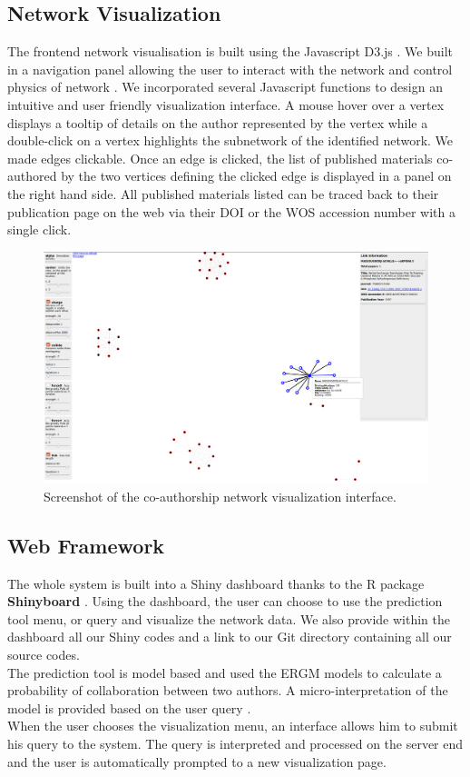 \subsection{Network Visualization}
The frontend network visualisation is built using the Javascript D3.js \cite{bostock_d3._2012}. We built in a navigation panel allowing the user to interact with the network and control physics of network \cite{newman_physics_2008}. We incorporated several Javascript functions to design an intuitive and user friendly visualization interface. A mouse hover over a vertex displays a tooltip of details on the author represented by the vertex while a double-click on a vertex highlights the subnetwork of the identified network. We made edges clickable. Once an edge is clicked, the list of published materials co-authored by the two vertices defining the clicked edge is displayed in a panel on the right hand side. All published materials listed can be traced back to their publication page on the web via their DOI or the WOS accession number with a single click.

\begin{figure}[!ht]
\centering
\hspace{-1.5cm}\includegraphics[scale=0.26]{Chapters/authorvis/vis3}
\caption{Screenshot of the co-authorship network visualization interface.}
\label{net_vis}
\end{figure}


\subsection{Web Framework}
The whole system is built into a Shiny dashboard thanks to the R package \textbf{Shinyboard} \cite{chang_shiny:_2017,chang_shinydashboard:_2015}. Using the dashboard, the user can choose to use the prediction tool menu, or query and visualize the network data. We also provide within the dashboard all our Shiny codes and a link to our Git directory containing all our source codes. \\
The prediction tool is model based and used the ERGM models to calculate a probability of collaboration between two authors. A micro-interpretation of the model is provided based on the user query  \cite{desmarais_micro-level_2012}. \\
When the user chooses the visualization menu, an interface allows him to submit his query to the system. The query is interpreted and processed on the server end and the user is automatically prompted to a new visualization page.


